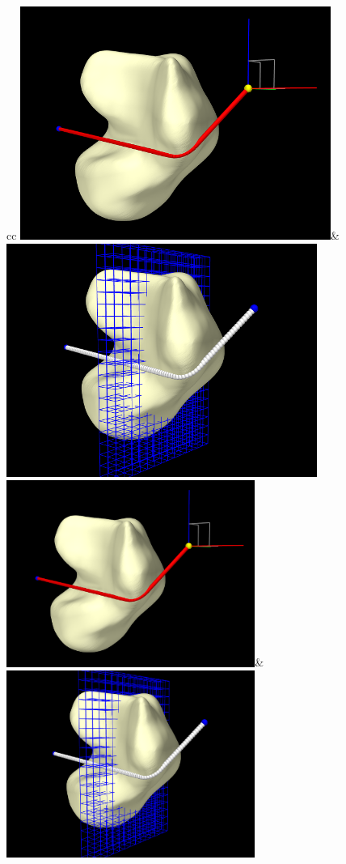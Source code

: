 \begin{figure}[t]
\begin{center}
\begin{tabular}{cc}
\iflatexml
 \includegraphics[]{images/TalusWrapping}&
 \includegraphics[]{images/TalusWrapping2}
\else
 \includegraphics[width=3.2in]{images/TalusWrapping}&
 \includegraphics[width=3.2in]{images/TalusWrapping2}

\end{tabular}
\end{center}
\end{figure}
